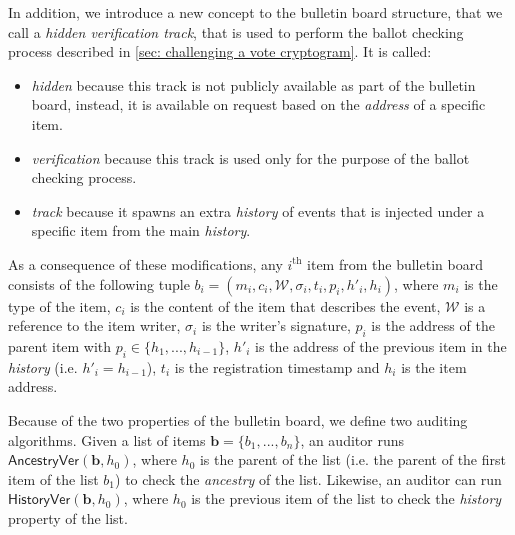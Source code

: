 In addition, we introduce a new concept to the bulletin board structure, that we call a \emph{hidden verification track}, that is used to perform the ballot checking process described in \cref{sec: challenging a vote cryptogram}. It is called:
\begin{itemize}
    \item \emph{hidden} because this track is not publicly available as part of the bulletin board, instead, it is available on request based on the \textit{address} of a specific item.
    \item \textit{verification} because this track is used only for the purpose of the ballot checking process.
    \item \emph{track} because it spawns an extra \textit{history} of events that is injected under a specific item from the main \textit{history}.
\end{itemize}

As a consequence of these modifications, any $i^\mathrm{th}$ item from the bulletin board consists of the following tuple $b_i = (m_i, c_i, \mathcal{W}, \sigma_i, t_i, p_i, h'_i, h_i)$, where $m_i$ is the type of the item, $c_i$ is the content of the item that describes the event, $\mathcal{W}$ is a reference to the item writer, $\sigma_i$ is the writer's signature, $p_i$ is the address of the parent item with $p_i \in \{h_1, ..., h_{i-1}\}$, $h'_i$ is the address of the previous item in the \textit{history} (i.e. $h'_i = h_{i-1}$), $t_i$ is the registration timestamp and $h_i$ is the item address.

Because of the two properties of the bulletin board, we define two auditing algorithms. Given a list of items $\boldsymbol{b} = \{ b_1, ..., b_n \}$, an auditor runs $\mathsf{AncestryVer}(\boldsymbol{b}, h_0)$, where $h_0$ is the parent of the list (i.e. the parent of the first item of the list $b_1$) to check the \textit{ancestry} of the list. Likewise, an auditor can run $\mathsf{HistoryVer}(\boldsymbol{b}, h_0)$, where $h_0$ is the previous item of the list to check the \textit{history} property of the list.

\begin{algorithm}[ht]
    \DontPrintSemicolon
    \caption{$\mathsf{AncestryVer}(\boldsymbol{b}, h_0)$}
    \label{alg: ancestry ver}

     
\end{algorithm}

